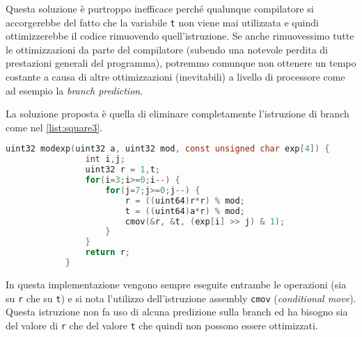 		Questa soluzione è purtroppo inefficace perché qualunque compilatore si accorgerebbe del fatto che la variabile \texttt{t} non viene mai utilizzata e quindi ottimizzerebbe il codice rimuovendo quell'istruzione. Se anche rimuovessimo tutte le ottimizzazioni da parte del compilatore (subendo una notevole perdita di prestazioni generali del programma), potremmo comunque non ottenere un tempo costante a causa di altre ottimizzazioni (inevitabili) a livello di processore come ad esempio la \emph{branch prediction}.
		
		La soluzione proposta è quella di eliminare completamente l'istruzione di branch come nel \cref{list:square3}.
		
		\begin{center}
			\begin{lstlisting}[language={C},caption={RSA, square and multiply v3},label={list:square3}]
			uint32 modexp(uint32 a, uint32 mod, const unsigned char exp[4]) {
				int i,j;
				uint32 r = 1,t;
				for(i=3;i>=0;i--) {
					for(j=7;j>=0;j--) {
						r = ((uint64)r*r) % mod;
						t = ((uint64)a*r) % mod;
						cmov(&r, &t, (exp[i] >> j) & 1);
					}
				}
				return r;
			}
			\end{lstlisting}
		\end{center}
	
		In questa implementazione vengono sempre eseguite entrambe le operazioni (sia su \texttt{r} che su \texttt{t}) e si nota l'utilizzo dell'istruzione assembly \texttt{cmov} (\emph{conditional move}). Questa istruzione non fa uso di alcuna predizione sulla branch ed ha bisogno sia del valore di \texttt{r} che del valore \texttt{t} che quindi non possono essere ottimizzati.
		